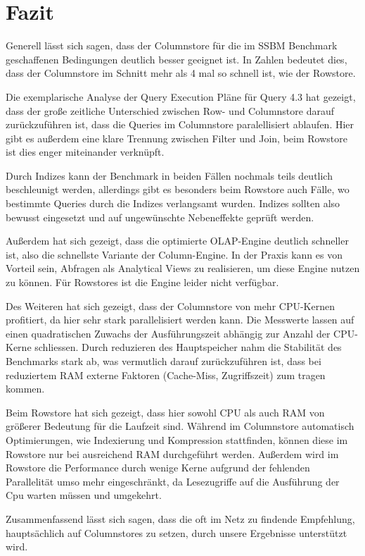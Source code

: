 \chapter{Fazit}\label{chapter:fazit}
Generell lässt sich sagen, dass der Columnstore für die im SSBM Benchmark
geschaffenen Bedingungen deutlich besser geeignet ist.
In Zahlen bedeutet dies, dass der Columnstore im Schnitt mehr als 4 mal so schnell ist,
wie der Rowstore.

Die exemplarische Analyse der Query Execution Pläne für Query 4.3 hat gezeigt,
dass der große zeitliche Unterschied zwischen Row- und 
Columnstore darauf zurückzuführen ist, dass die Queries im Columnstore paralellisiert ablaufen.
Hier gibt es außerdem eine klare Trennung zwischen Filter und Join,
beim Rowstore ist dies enger miteinander verknüpft. 


Durch Indizes kann der Benchmark in beiden Fällen nochmals teils deutlich beschleunigt werden,
allerdings gibt es besonders beim Rowstore auch Fälle,
wo bestimmte Queries durch die Indizes verlangsamt wurden.
Indizes sollten also bewusst eingesetzt und auf ungewünschte Nebeneffekte geprüft werden.

Außerdem hat sich gezeigt, dass die optimierte OLAP-Engine deutlich schneller ist,
also die schnellste Variante der Column-Engine.
In der Praxis kann es von Vorteil sein, Abfragen als Analytical Views zu realisieren,
um diese Engine nutzen zu können. Für Rowstores ist die Engine leider nicht verfügbar.

Des Weiteren hat sich gezeigt, dass der Columnstore von mehr CPU-Kernen profitiert,
da hier sehr stark parallelisiert werden kann. 
Die Messwerte lassen auf einen quadratischen Zuwachs der Ausführungszeit
abhängig zur Anzahl der CPU-Kerne schliessen.
Durch reduzieren des Hauptspeicher nahm die Stabilität des Benchmarks stark ab,
was vermutlich darauf zurückzuführen ist, dass bei reduziertem RAM
externe Faktoren (Cache-Miss, Zugriffszeit) zum tragen kommen. 

Beim Rowstore hat sich gezeigt, dass hier sowohl CPU als auch RAM von größerer
Bedeutung für die Laufzeit sind. 
Während im Columnstore automatisch Optimierungen, wie Indexierung und Kompression stattfinden,
können diese im Rowstore nur bei ausreichend RAM durchgeführt werden. 
Außerdem wird im Rowstore die Performance durch wenige Kerne aufgrund der fehlenden Parallelität umso mehr eingeschränkt, da Lesezugriffe auf die Ausführung der Cpu warten müssen und umgekehrt. 

Zusammenfassend lässt sich sagen, dass die oft im Netz zu findende Empfehlung,
hauptsächlich auf Columnstores zu setzen, durch unsere Ergebnisse unterstützt wird.
